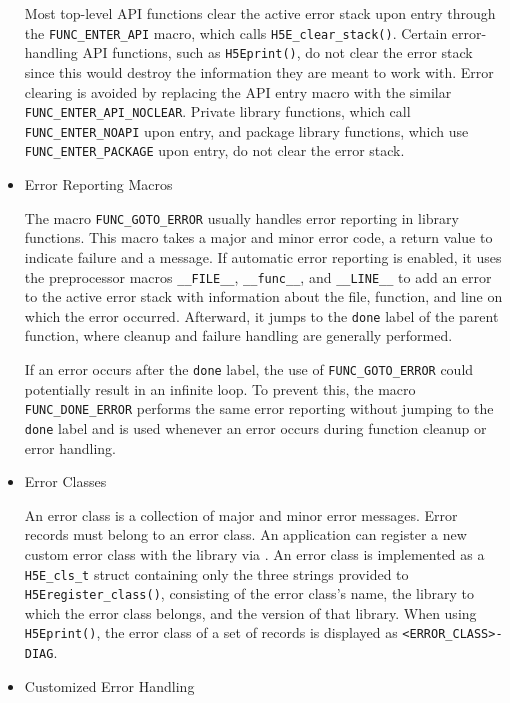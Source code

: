\begin{itemize}
Most top-level API functions clear the active error stack upon entry through the \texttt{FUNC\_ENTER\_API} macro, which calls \texttt{H5E\_clear\_stack()}. Certain error-handling API functions, such as \texttt{H5Eprint()}, do not clear the error stack since this would destroy the information they are meant to work with. Error clearing is avoided by replacing the API entry macro with the similar \texttt{FUNC\_ENTER\_API\_NOCLEAR}. Private library functions, which call \texttt{FUNC\_ENTER\_NOAPI} upon entry, and package library functions, which use \texttt{FUNC\_ENTER\_PACKAGE} upon entry, do not clear the error stack.

\item Error Reporting Macros

The macro \texttt{FUNC\_GOTO\_ERROR} usually handles error reporting in library functions. This macro takes a major and minor error code, a return value to indicate failure and a message. If automatic error reporting is enabled, it uses the preprocessor macros \texttt{\_\_FILE\_\_}, \texttt{\_\_func\_\_}, and \texttt{\_\_LINE\_\_} to add an error to the active error stack with information about the file, function, and line on which the error occurred. Afterward, it jumps to the \texttt{done} label of the parent function, where cleanup and failure handling are generally performed.

If an error occurs after the \texttt{done} label, the use of \texttt{FUNC\_GOTO\_ERROR} could potentially result in an infinite loop. To prevent this, the macro \texttt{FUNC\_DONE\_ERROR} performs the same error reporting without jumping to the \texttt{done} label and is used whenever an error occurs during function cleanup or error handling.

\item Error Classes

An error class is a collection of major and minor error messages. Error records must belong to an error class. An application can register a new custom error class with the library via . An error class is implemented as a \texttt{H5E\_cls\_t} struct containing only the three strings provided to \texttt{H5Eregister\_class()}, consisting of the error class's name, the library to which the error class belongs, and the version of that library. When using \texttt{H5Eprint()}, the error class of a set of records is displayed as \texttt{<ERROR\_CLASS>-DIAG}.

\item Customized Error Handling


\end{itemize}
